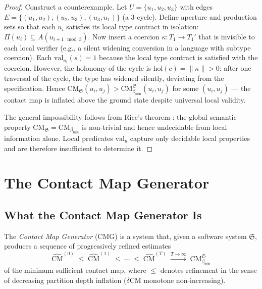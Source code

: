 \documentclass[12pt,a4paper,twocolumn]{article}
\theoremstyle{plain}
\theoremstyle{definition}
\theoremstyle{remark}
\newcommand{\CM}{\mathrm{CM}}
\newcommand{\bmin}{\beta_{\min}}
\newcommand{\CMbmin}{\CM_{\bmin}}
\newcommand{\hol}{\mathrm{hol}}
\newcommand{\val}{\mathrm{val}}
\begin{document}
\begin{proof}
Construct a counterexample.  Let $U = \{u_1, u_2, u_3\}$ with edges
$E = \{(u_1,u_2),(u_2,u_3),(u_3,u_1)\}$ (a 3-cycle).  Define aperture and
production sets so that each $u_i$ satisfies its local type contract in
isolation: $\Pi(u_i) \subseteq A(u_{i+1 \mod 3})$.  Now insert a coercion
$\kappa : T_1 \to T_1'$ that is invisible to each local verifier (e.g., a
silent widening conversion in a language with subtype coercion).  Each
$\val_{u_i}(s) = 1$ because the local type contract is satisfied with the
coercion.  However, the holonomy of the cycle is $\hol(c) = \|\kappa\| > 0$:
after one traversal of the cycle, the type has widened silently, deviating
from the specification.  Hence $\CM_\mathfrak{S}(u_i, u_j) >
\CMbmin^\mathfrak{S}(u_i, u_j)$ for some $(u_i,u_j)$ --- the contact map
is inflated above the ground state despite universal local validity.

The general impossibility follows from Rice's theorem \citep{rice1953classes}:
the global semantic property $\CM_\mathfrak{S} = \CMbmin$ is non-trivial and
hence undecidable from local information alone.  Local predicates $\val_u$
capture only decidable local properties and are therefore insufficient to
determine it.
\end{proof}

\section{The Contact Map Generator}
\label{sec:generator}

\subsection{What the Contact Map Generator Is}

The \emph{Contact Map Generator} (CMG) is a system that, given a software
system $\mathfrak{S}$, produces a sequence of progressively refined estimates
\begin{equation}
  \hat{\CM}^{(0)} \;\leq\; \hat{\CM}^{(1)} \;\leq\; \cdots \;\leq\; \hat{\CM}^{(T)}
    \;\xrightarrow{T\to\infty}\; \CMbmin^\mathfrak{S}
\end{equation}
of the minimum sufficient contact map, where $\leq$ denotes refinement in the
sense of decreasing partition depth inflation ($\delta\CM$ monotone
non-increasing).
\end{document}
